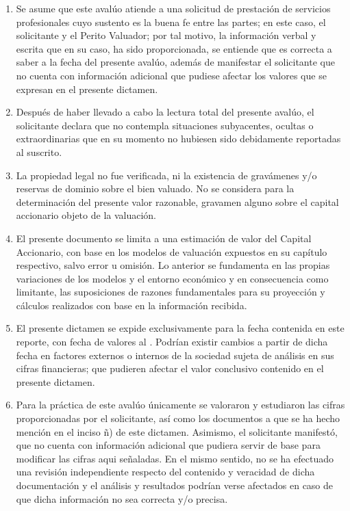 \begin{enumerate}[\indent a)]
\item Se asume que este aval\'uo atiende a una solicitud de prestaci\'on de servicios profesionales cuyo sustento es la buena fe entre las partes; en este caso, el solicitante y el Perito Valuador; por tal motivo, la informaci\'on verbal y escrita que en su caso, ha sido proporcionada, se entiende que es correcta a saber a la fecha del presente aval\'uo, adem\'as de manifestar el solicitante que no cuenta con informaci\'on adicional  que pudiese afectar los valores que se expresan en el presente dictamen.
\item Despu\'es de haber llevado a cabo la lectura total del presente aval\'uo, el solicitante declara que no contempla situaciones subyacentes, ocultas o extraordinarias que en su momento no hubiesen sido debidamente reportadas al suscrito.
\item La propiedad legal no fue verificada, ni la existencia de grav\'amenes y/o reservas de dominio sobre el bien valuado. No se considera para la determinaci\'on del presente valor razonable, gravamen alguno sobre el capital accionario objeto de la valuaci\'on.
\item El presente documento se limita a una estimaci\'on de valor del Capital Accionario, con base en los modelos de valuaci\'on expuestos en su cap\'itulo respectivo, salvo error u omisi\'on. Lo anterior se fundamenta en las propias variaciones de los modelos y el entorno econ\'omico y en consecuencia como limitante, las suposiciones de razones fundamentales para su proyecci\'on y c\'alculos realizados con base en la informaci\'on recibida.

\item El presente dictamen se expide exclusivamente para la fecha contenida en este reporte, con fecha de valores  al \textcolor{principal}{\textbf{\fechaValores}}. Podr\'ian existir cambios a partir de dicha fecha en factores externos o internos de la sociedad sujeta de an\'alisis en sus cifras financieras; que pudieren afectar el valor conclusivo contenido en el presente dictamen.
\item Para la pr\'actica de este aval\'uo \'unicamente se valoraron y estudiaron las cifras proporcionadas por el solicitante, as\'i como los documentos a que se ha hecho menci\'on en el inciso \~n) de este dictamen. Asimismo, el solicitante manifest\'o, que no cuenta con informaci\'on adicional que pudiera servir de base para modificar las cifras aqui se\~naladas. En el mismo sentido, no se ha efectuado una revisi\'on independiente respecto del contenido y veracidad de dicha documentaci\'on y el an\'alisis y resultados podr\'ian verse afectados en caso de que dicha informaci\'on no sea correcta y/o precisa.


\end{enumerate}

